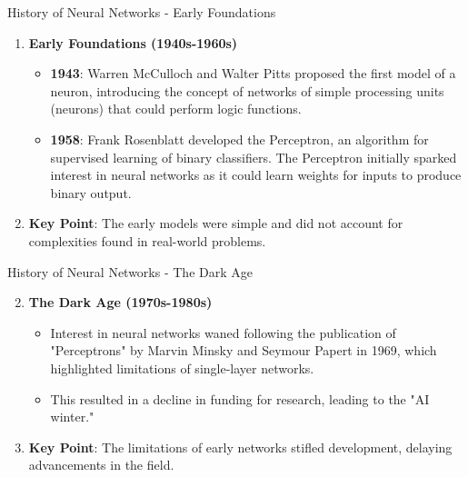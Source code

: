\documentclass[aspectratio=169]{beamer}
\begin{document}
\begin{frame}[fragile]{History of Neural Networks - Early Foundations}
    \begin{enumerate}
        \item \textbf{Early Foundations (1940s-1960s)}
            \begin{itemize}
                \item \textbf{1943}: Warren McCulloch and Walter Pitts proposed the first model of a neuron, introducing the concept of networks of simple processing units (neurons) that could perform logic functions.
                \item \textbf{1958}: Frank Rosenblatt developed the Perceptron, an algorithm for supervised learning of binary classifiers. The Perceptron initially sparked interest in neural networks as it could learn weights for inputs to produce binary output.
            \end{itemize}
        \item \textbf{Key Point}: The early models were simple and did not account for complexities found in real-world problems.
    \end{enumerate}
\end{frame}

\begin{frame}[fragile]{History of Neural Networks - The Dark Age}
    \begin{enumerate}
        \setcounter{enumi}{1}
        \item \textbf{The Dark Age (1970s-1980s)}
            \begin{itemize}
                \item Interest in neural networks waned following the publication of "Perceptrons" by Marvin Minsky and Seymour Papert in 1969, which highlighted limitations of single-layer networks.
                \item This resulted in a decline in funding for research, leading to the "AI winter."
            \end{itemize}
        \item \textbf{Key Point}: The limitations of early networks stifled development, delaying advancements in the field.
    \end{enumerate}
\end{frame}
\end{document}

